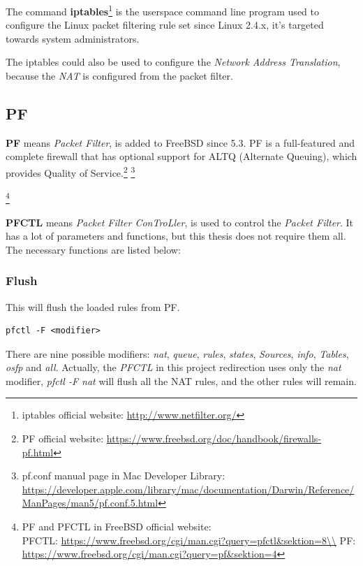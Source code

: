 The command \textbf{iptables}\footnote{iptables official website: \url{http://www.netfilter.org/}} is the userspace command line program used to configure the Linux packet filtering rule set since Linux 2.4.x, it's targeted towards system administrators.

The iptables could also be used to configure the \textit{Network Address Translation}, because the \textit{NAT} is configured from the packet filter.

\subsection{PF}

\textbf{PF} means \textit{Packet Filter}, is added to FreeBSD since 5.3. PF is a full-featured and complete firewall that has optional support for ALTQ (Alternate Queuing), which provides Quality of Service.\footnote{PF official website: \url{https://www.freebsd.org/doc/handbook/firewalls-pf.html}}
\footnote{pf.conf manual page in Mac Developer Library: \url{https://developer.apple.com/library/mac/documentation/Darwin/Reference/ManPages/man5/pf.conf.5.html}}

\footnote{PF and PFCTL in FreeBSD official website:\\ 
	PFCTL: \url{https://www.freebsd.org/cgi/man.cgi?query=pfctl&sektion=8\\}
	PF: \url{https://www.freebsd.org/cgi/man.cgi?query=pf&sektion=4}}

\textbf{PFCTL} means \textit{Packet Filter ConTroLler}, is used to control the \textit{Packet Filter}. It has a lot of parameters and functions, but this thesis does not require them all. The necessary functions are listed below:

\subsubsection{Flush}

This will flush the loaded rules from PF.

\begin{lstlisting}
pfctl -F <modifier>
\end{lstlisting}

There are nine possible modifiers: \textit{nat}, \textit{queue}, \textit{rules}, \textit{states}, \textit{Sources}, \textit{info}, \textit{Tables}, \textit{osfp} and \textit{all}. Actually, the \textit{PFCTL} in this project redirection uses only the \textit{nat} modifier, \textit{pfctl -F nat} will flush all the NAT rules, and the other rules will remain.

